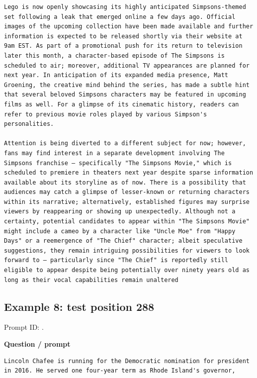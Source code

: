 \begin{Verbatim}
Lego is now openly showcasing its highly anticipated Simpsons-themed set following a leak that emerged online a few days ago. Official images of the upcoming collection have been made available and further information is expected to be released shortly via their website at 9am EST. As part of a promotional push for its return to television later this month, a character-based episode of The Simpsons is scheduled to air; moreover, additional TV appearances are planned for next year. In anticipation of its expanded media presence, Matt Groening, the creative mind behind the series, has made a subtle hint that several beloved Simpsons characters may be featured in upcoming films as well. For a glimpse of its cinematic history, readers can refer to previous movie roles played by various Simpson's personalities.

Attention is being diverted to a different subject for now; however, fans may find interest in a separate development involving The Simpsons franchise – specifically "The Simpsons Movie," which is scheduled to premiere in theaters next year despite sparse information available about its storyline as of now. There is a possibility that audiences may catch a glimpse of lesser-known or returning characters within its narrative; alternatively, established figures may surprise viewers by reappearing or showing up unexpectedly. Although not a certainty, potential candidates to appear within "The Simpsons Movie" might include a cameo by a character like "Uncle Moe" from "Happy Days" or a reemergence of "The Chief" character; albeit speculative suggestions, they remain intriguing possibilities for viewers to look forward to – particularly since "The Chief" is reportedly still eligible to appear despite being potentially over ninety years old as long as their vocal capabilities remain unaltered
\end{Verbatim}

\subsection{Example 8: test position
288}\label{record-docs-watermarking-qualitative-paper-sir-bira-md-example-8-test-position-288}

Prompt ID:
\texttt{}.

\textbf{Question / prompt}

\begin{Verbatim}
Lincoln Chafee is running for the Democratic nomination for president in 2016. He served one four-year term as Rhode Island's governor,
\end{Verbatim}

